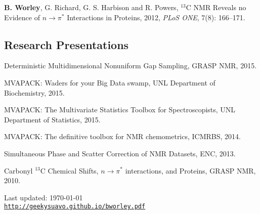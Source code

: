 \documentclass[letterpaper]{article}
\def\footerlink{http://geekysuavo.github.io/bworley.pdf}
\renewenvironment{itemize}{
  \begin{list}{}{
    \setlength{\leftmargin}{1.5em}
  }
}{
  \end{list}
}
\begin{document}
\begin{itemize}
\item \textbf{B. Worley}, G. Richard, G. S. Harbison and R. Powers,
  $^{13}$C NMR Reveals no Evidence of $n\rightarrow\pi^*$ Interactions
  in Proteins, 2012, {\it PLoS ONE}, 7(8): 166--171.
\end{itemize}

\subsection*{Research Presentations}

\begin{itemize}
\item Deterministic Multidimensional Nonuniform Gap Sampling,
  GRASP NMR, 2015.
\end{itemize}

\begin{itemize}
\item MVAPACK: Waders for your Big Data swamp,
  UNL Department of Biochemistry, 2015.
\end{itemize}

\begin{itemize}
\item MVAPACK: The Multivariate Statistics Toolbox for Spectroscopists,
  UNL Department of Statistics, 2015.
\end{itemize}

\begin{itemize}
\item MVAPACK: The definitive toolbox for NMR chemometrics, ICMRBS, 2014.
\end{itemize}

\begin{itemize}
\item Simultaneous Phase and Scatter Correction of NMR Datasets, ENC, 2013.
\end{itemize}

\begin{itemize}
\item Carbonyl $^{13}$C Chemical Shifts, $n\rightarrow\pi^*$ interactions,
  and Proteins, GRASP NMR, 2010.
\end{itemize}

\bigskip

\begin{center}
  \begin{footnotesize}
    Last updated: \today \\
    \href{\footerlink}{\texttt{\footerlink}}
  \end{footnotesize}
\end{center}

\end{document}
